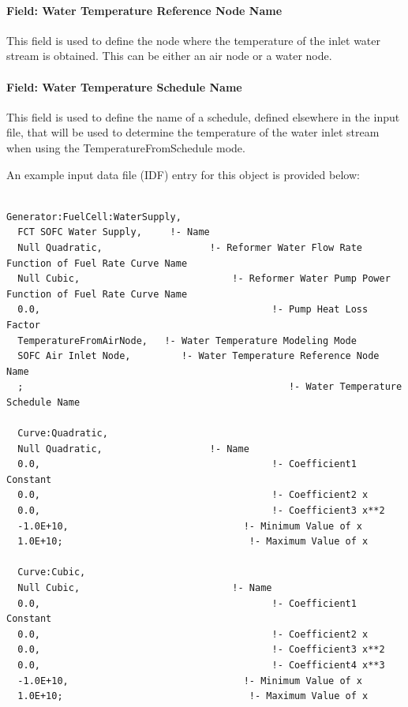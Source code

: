 \paragraph{Field: Water Temperature Reference Node Name}\label{field-water-temperature-reference-node-name}

This field is used to define the node where the temperature of the inlet water stream is obtained. This can be either an air node or a water node.

\paragraph{Field: Water Temperature Schedule Name}\label{field-water-temperature-schedule-name}

This field is used to define the name of a schedule, defined elsewhere in the input file, that will be used to determine the temperature of the water inlet stream when using the TemperatureFromSchedule mode.

An example input data file (IDF) entry for this object is provided below:

\begin{lstlisting}

Generator:FuelCell:WaterSupply,
  FCT SOFC Water Supply,     !- Name
  Null Quadratic,                   !- Reformer Water Flow Rate Function of Fuel Rate Curve Name
  Null Cubic,                           !- Reformer Water Pump Power Function of Fuel Rate Curve Name
  0.0,                                         !- Pump Heat Loss Factor
  TemperatureFromAirNode,   !- Water Temperature Modeling Mode
  SOFC Air Inlet Node,         !- Water Temperature Reference Node Name
  ;                                               !- Water Temperature Schedule Name

  Curve:Quadratic,
  Null Quadratic,                   !- Name
  0.0,                                         !- Coefficient1 Constant
  0.0,                                         !- Coefficient2 x
  0.0,                                         !- Coefficient3 x**2
  -1.0E+10,                               !- Minimum Value of x
  1.0E+10;                                 !- Maximum Value of x

  Curve:Cubic,
  Null Cubic,                           !- Name
  0.0,                                         !- Coefficient1 Constant
  0.0,                                         !- Coefficient2 x
  0.0,                                         !- Coefficient3 x**2
  0.0,                                         !- Coefficient4 x**3
  -1.0E+10,                               !- Minimum Value of x
  1.0E+10;                                 !- Maximum Value of x
\end{lstlisting}

